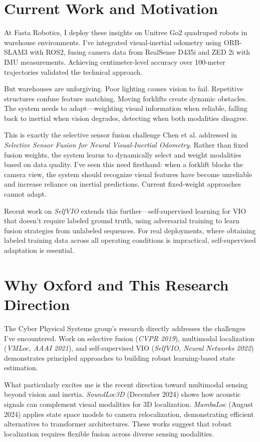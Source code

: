 \documentclass[12pt]{article}
\begin{document}
\section*{Current Work and Motivation}

At Fasta Robotics, I deploy these insights on Unitree Go2 quadruped robots in warehouse environments. I've integrated visual-inertial odometry using ORB-SLAM3 with ROS2, fusing camera data from RealSense D435i and ZED 2i with IMU measurements. Achieving centimeter-level accuracy over 100-meter trajectories validated the technical approach.

But warehouses are unforgiving. Poor lighting causes vision to fail. Repetitive structures confuse feature matching. Moving forklifts create dynamic obstacles. The system needs to adapt—weighting visual information when reliable, falling back to inertial when vision degrades, detecting when both modalities disagree.

This is exactly the selective sensor fusion challenge Chen et al. addressed in \textit{Selective Sensor Fusion for Neural Visual-Inertial Odometry}. Rather than fixed fusion weights, the system learns to dynamically select and weight modalities based on data quality. I've seen this need firsthand: when a forklift blocks the camera view, the system should recognize visual features have become unreliable and increase reliance on inertial predictions. Current fixed-weight approaches cannot adapt.

Recent work on \textit{SelfVIO} extends this further—self-supervised learning for VIO that doesn't require labeled ground truth, using adversarial training to learn fusion strategies from unlabeled sequences. For real deployments, where obtaining labeled training data across all operating conditions is impractical, self-supervised adaptation is essential.

\section*{Why Oxford and This Research Direction}

The Cyber Physical Systems group's research directly addresses the challenges I've encountered. Work on selective fusion (\textit{CVPR 2019}), multimodal localization (\textit{VMLoc, AAAI 2021}), and self-supervised VIO (\textit{SelfVIO, Neural Networks 2022}) demonstrates principled approaches to building robust learning-based state estimation.

What particularly excites me is the recent direction toward multimodal sensing beyond vision and inertia. \textit{SoundLoc3D} (December 2024) shows how acoustic signals can complement visual modalities for 3D localization. \textit{MambaLoc} (August 2024) applies state space models to camera relocalization, demonstrating efficient alternatives to transformer architectures. These works suggest that robust localization requires flexible fusion across diverse sensing modalities.
\end{document}
